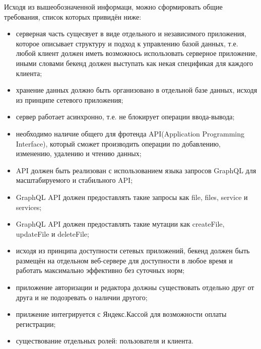 Исходя из вышеобозначенной информаци, можно сформировать общие требования, список которых привидён ниже:
\begin{itemize}
    \item серверная часть сущесвует в виде отдельного и независимого приложения, которое описывает структуру и подход к управлению базой данных, т.е. любой клиент должен иметь возможнось использовать серверное приложение, иными словами бекенд должен выступать как некая спецификая для каждого клиента;
    \item хранение данных должно быть организовано в отдельной базе данных, исходя из принципе сетевого приложения;
    \item сервер работает асинхронно, т.е. не блокирует операции ввода-вывода;
    \item необходимо наличие общего для фротенда API(Application Programming Interface), который сможет производить операции по добавлению, изменению, удалению и чтению данных;
    \item API должен быть реализован с использованием языка запросов GraphQL для масштабируемого и стабильного API;
    \item GraphQL API должен предоставлять такие запросы как file, files, service и services;
    \item GraphQL API должен предоставлять такие мутации как createFile, updateFile и deleteFile;
    \item исходя из принципа доступности сетевых приложений, бекенд должен быть размещён на отдельном веб-сервере для доступности в любое время и работать максимально эффективно без суточных норм;
    \item приложение авторизации и редактора должны существовать отдельно друг от друга и не подозревать о наличии другого;
    \item прилжение интегрируется с Яндекс.Кассой для возможности оплаты регистрации;
    \item существование отдельных ролей: пользователя и клиента.
\end{itemize}
